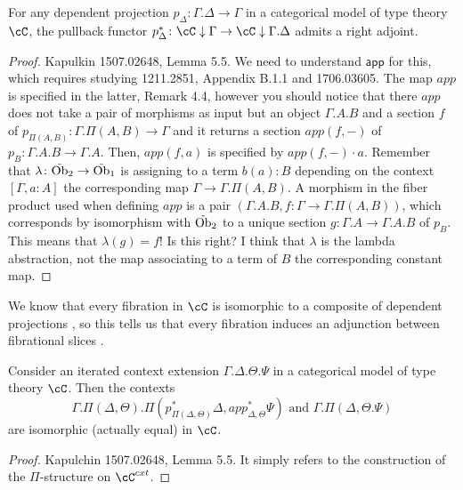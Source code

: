 \documentclass[a4paper,12pt]{scrartcl}
\begin{document}
\begin{lem}
  For any dependent projection $p_\Delta\colon\Gamma.\Delta\rightarrow\Gamma$ in
  a categorical model of type theory $\cC$, the pullback functor
  $p_\Delta^*\colon\cC\downarrow\Gamma\rightarrow\cC\downarrow\Gamma.\Delta$
  admits a right adjoint.
\end{lem}
\begin{proof}
  Kapulkin 1507.02648, Lemma 5.5. We need to understand $\mathsf{app}$ for this,
  which requires studying 1211.2851, Appendix B.1.1 and 1706.03605. The map
  $app$ is specified in the latter, Remark 4.4, however you should notice that
  there $app$ does not take a pair of morphisms as input but an object
  $\Gamma.A.B$ and a section $f$ of
  $p_{\Pi(A,B)}\colon\Gamma.\Pi(A,B)\rightarrow\Gamma$ and it returns a section
  $app(f,-)$ of $p_{B}\colon\Gamma.A.B\rightarrow\Gamma.A$. Then, $app(f,a)$ is
  specified by $app(f,-)\cdot a$. Remember that
  $\lambda\colon\tilde{\operatorname{Ob}}_2\rightarrow\tilde{\operatorname{Ob}}_1$ is assigning to a term
  $b(a):B$ depending on the context $[\Gamma,a:A]$
  the corresponding map $\Gamma\rightarrow\Gamma.\Pi(A,B)$. A
  morphism in the fiber product used when defining $app$ is a pair
  $(\Gamma.A.B,f\colon\Gamma\rightarrow\Gamma.\Pi(A,B))$, which corresponds by
  isomorphism with $\tilde{\operatorname{Ob}}_2$ to a unique section
  $g\colon\Gamma.A\rightarrow\Gamma.A.B$ of $p_B$. This means that
  $\lambda(g)=f$! Is this right? I think that $\lambda$ is the lambda
  abstraction, not the map associating to a term of $B$ the corresponding
  constant map.
\end{proof}

We know that every fibration in $\cC$ is isomorphic to a composite of dependent
projections , so this tells us that every fibration induces an adjunction
between fibrational slices .

\begin{lem}
  Consider an iterated context extension $\Gamma.\Delta.\Theta.\Psi$ in a
  categorical model of type theory $\cC$. Then the contexts
  \[\Gamma.\Pi(\Delta,\Theta).\Pi(p^*_{\Pi(\Delta,\Theta)}\Delta,app^*_{\Delta,\Theta}\Psi)
    \text{ and }
  \Gamma.\Pi(\Delta,\Theta.\Psi)\]
  are isomorphic (actually equal) in $\cC$.
\end{lem}
\begin{proof}
  Kapulchin 1507.02648, Lemma 5.5. It simply refers to the construction of the
  $\Pi$-structure on $\cC^{cxt}$.
\end{proof}
\end{document}
